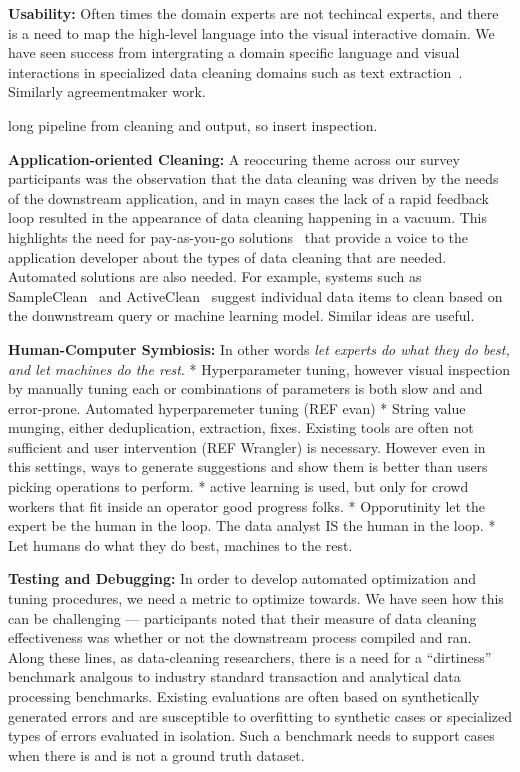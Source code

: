 \noindent\textbf{Usability:} Often times the domain experts are not techincal experts, and there is a need to map the high-level language into the visual interactive domain.  We have seen success from intergrating a domain specific language and visual interactions  in specialized data cleaning domains such as text extraction~\cite{wrangler}.  Similarly agreementmaker work.

long pipeline from cleaning and output, so insert inspection.  

\noindent\textbf{Application-oriented Cleaning:}  A reoccuring theme across our survey participants was the observation that the data cleaning was driven by the needs of the downstream application, and in mayn cases the lack of a rapid feedback loop resulted in the appearance of data cleaning happening in a vacuum.  This highlights the need for pay-as-you-go solutions~\cite{dataspaces} that provide a voice to the application developer about the types of data cleaning that are needed.  Automated solutions are also needed. For example, systems such as SampleClean~\cite{} and ActiveClean~\cite{} suggest individual data items to clean based on the donwnstream query or machine learning model.   Similar ideas are useful.

\noindent\textbf{Human-Computer Symbiosis:}  In other words {\it let experts do what they do best, and let machines do the rest}.
    * Hyperparameter tuning, however visual inspection by manually tuning each or combinations of parameters is both slow and and error-prone.  Automated hyperparemeter tuning (REF evan)
    * String value munging, either deduplication, extraction, fixes.  Existing tools are often not sufficient and user intervention (REF Wrangler) is necessary.  However even in this settings, ways to generate suggestions and show them is better than users picking operations to perform.
    * active learning is used, but only for crowd workers that fit inside an operator good progress folks.
    * Opporutinity let the expert be the human in the loop.  The data analyst IS the human in the loop.
    * Let humans do what they do best, machines to the rest.


\noindent\textbf{Testing and Debugging:} In order to develop automated optimization and tuning procedures, we need a metric to optimize towards.  We have seen how this can be challenging --- participants noted that their measure of data cleaning effectiveness was whether or not the downstream process compiled and ran.  
Along these lines, as data-cleaning researchers, there is a need for a ``dirtiness'' benchmark analgous to industry standard transaction and analytical data processing benchmarks.  Existing evaluations are often based on synthetically generated errors and are susceptible to overfitting to synthetic cases or specialized types of errors evaluated in isolation.  Such a benchmark needs to support cases when there is and is not a ground truth dataset.

